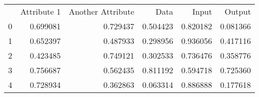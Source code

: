 \begin{tabular}{lrrrrr}
 & Attribute 1 & Another Attribute & Data & Input & Output \\
0 & 0.699081 & 0.729437 & 0.504423 & 0.820182 & 0.081366 \\
1 & 0.652397 & 0.487933 & 0.298956 & 0.936056 & 0.417116 \\
2 & 0.423485 & 0.749121 & 0.302533 & 0.736476 & 0.358776 \\
3 & 0.756687 & 0.562435 & 0.811192 & 0.594718 & 0.725360 \\
4 & 0.728934 & 0.362863 & 0.063314 & 0.886888 & 0.177618 \\
\end{tabular}
